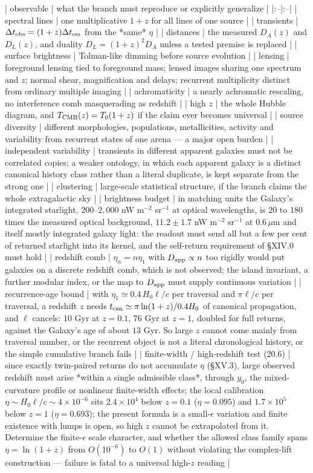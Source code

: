 | observable | what the branch must reproduce or explicitly generalize |
|:--|:--|
| spectral lines | one multiplicative $1+z$ for all lines of one source |
| transients | $\Delta t_{\rm obs} = (1+z)\Delta t_{\rm em}$ from the *same* $\eta$ |
| distances | the measured $D_A(z)$ and $D_L(z)$, and duality $D_L = (1+z)^2D_A$ unless a tested premise is replaced |
| surface brightness | Tolman-like dimming before source evolution |
| lensing | foreground lensing tied to foreground mass; lensed images sharing one spectrum and $z$; normal shear, magnification and delays; recurrent multiplicity distinct from ordinary multiple imaging |
| achromaticity | a nearly achromatic rescaling, no interference comb masquerading as redshift |
| high $z$ | the whole Hubble diagram, and $T_{\rm CMB}(z) = T_0(1+z)$ if the claim ever becomes universal |
| source diversity | different morphologies, populations, metallicities, activity and variability from recurrent states of one arena — a major open burden |
| independent variability | transients in different apparent galaxies must not be correlated copies; a weaker ontology, in which each apparent galaxy is a distinct canonical history class rather than a literal duplicate, is kept separate from the strong one |
| clustering | large-scale statistical structure, if the branch claims the whole extragalactic sky |
| brightness budget | in matching units the Galaxy's integrated starlight, $200$–$2{,}000$ nW m$^{-2}$ sr$^{-1}$ at optical wavelengths, is $20$ to $180$ times the measured optical background, $11.2\pm1.7$ nW m$^{-2}$ sr$^{-1}$ at $0.6\,\mu$m and itself mostly integrated galaxy light: the readout must send all but a few per cent of returned starlight into its kernel, and the self-return requirement of §XIV.0 must hold |
| redshift comb | $\eta_n = n\eta_1$ with $D_{\rm app}\propto n$ too rigidly would put galaxies on a discrete redshift comb, which is not observed; the island invariant, a further modular index, or the map to $D_{\rm app}$ must supply continuous variation |
| recurrence-age bound | with $\eta_1\simeq0.4\,H_0\ell/c$ per traversal and $\pi\ell/c$ per traversal, a redshift $z$ needs $t_{\rm can}\simeq\pi\ln(1+z)/0.4H_0$ of canonical propagation, and $\ell$ cancels: $10$ Gyr at $z = 0.1$, $76$ Gyr at $z = 1$, doubled for full returns, against the Galaxy's age of about $13$ Gyr. So large $z$ cannot come mainly from traversal number, or the recurrent object is not a literal chronological history, or the simple cumulative branch fails |
| finite-width / high-redshift test (20.6) | since exactly twin-paired returns do not accumulate $\eta$ (§XV.3), large observed redshift must arise *within a single admissible class*, through $y_0$, the mixed-curvature profile or nonlinear finite-width effects; the local calibration $\eta\sim H_0\ell/c\sim4\times10^{-6}$ sits $2.4\times10^4$ below $z = 0.1$ ($\eta = 0.095$) and $1.7\times10^5$ below $z = 1$ ($\eta = 0.693$); the present formula is a small-$\epsilon$ variation and finite existence with lumps is open, so high $z$ cannot be extrapolated from it. Determine the finite-$\epsilon$ scale character, and whether the allowed class family spans $\eta = \ln(1+z)$ from $O(10^{-6})$ to $O(1)$ without violating the complex-lift construction — failure is fatal to a universal high-$z$ reading |
